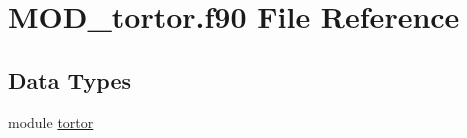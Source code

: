 \hypertarget{MOD__tortor_8f90}{\section{M\-O\-D\-\_\-tortor.\-f90 File Reference}
\label{MOD__tortor_8f90}
}
\subsection*{Data Types}
\begin{DoxyCompactItemize}
\item 
module \hyperlink{classtortor}{tortor}
\end{DoxyCompactItemize}
